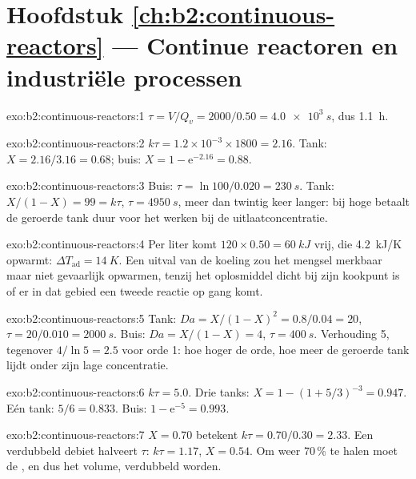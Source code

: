 \section*{Hoofdstuk \ref{ch:b2:continuous-reactors} --- Continue reactoren en industriële processen}

\begin{solution}{exo:b2:continuous-reactors:1}
$\tau = V/Q_v = 2000/0.50 = \qty{4.0e3}{s}$, dus \qty{1.1}{h}.
\end{solution}

\begin{solution}{exo:b2:continuous-reactors:2}
$k\tau = 1.2 \times 10^{-3} \times 1800 = 2.16$. Tank: $X = 2.16/3.16 = 0.68$;
buis: $X = 1 - \mathrm e^{-2.16} = 0.88$.
\end{solution}

\begin{solution}{exo:b2:continuous-reactors:3}
Buis: $\tau = \ln 100/0.020 = \qty{230}{s}$. Tank: $X/(1 - X) = 99 = k\tau$,
$\tau = \qty{4950}{s}$, meer dan twintig keer langer: bij hoge  betaalt de
geroerde tank duur voor het werken bij de uitlaatconcentratie.
\end{solution}

\begin{solution}{exo:b2:continuous-reactors:4}
Per liter komt $120 \times 0.50 = \qty{60}{kJ}$ vrij, die
\qty{4.2}{kJ/K} opwarmt: $\Delta T_{\text{ad}} = \qty{14}{K}$. Een uitval van de koeling
zou het mengsel merkbaar maar niet gevaarlijk opwarmen, tenzij het oplosmiddel
dicht bij zijn kookpunt is of er in dat gebied een tweede reactie op gang komt.
\end{solution}

\begin{solution}{exo:b2:continuous-reactors:5}
Tank: $Da = X/(1 - X)^2 = 0.8/0.04 = 20$, $\tau = 20/0.010 = \qty{2000}{s}$.
Buis: $Da = X/(1 - X) = 4$, $\tau = \qty{400}{s}$. Verhouding 5, tegenover $4/\ln 5 =
2.5$ voor orde 1: hoe hoger de orde, hoe meer de geroerde tank lijdt onder
zijn lage concentratie.
\end{solution}

\begin{solution}{exo:b2:continuous-reactors:6}
$k\tau = 5.0$. Drie tanks: $X = 1 - (1 + 5/3)^{-3} = 0.947$. Eén tank: $5/6 =
0.833$. Buis: $1 - \mathrm e^{-5} = 0.993$.
\end{solution}

\begin{solution}{exo:b2:continuous-reactors:7}
$X = 0.70$ betekent $k\tau = 0.70/0.30 = 2.33$. Een verdubbeld debiet halveert $\tau$:
$k\tau = 1.17$, $X = 0.54$. Om weer 70\,\% te halen moet de , en dus het
volume, verdubbeld worden.
\end{solution}


